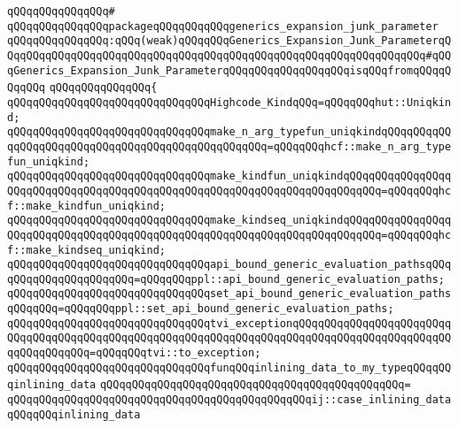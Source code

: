 \verb|qQQqqQQqqQQqqQQq#|\newline
\verb|qQQqqQQqqQQqqQQqpackageqQQqqQQqqQQqgenerics_expansion_junk_parameter|\newline
\verb|qQQqqQQqqQQqqQQq:qQQq(weak)qQQqqQQqGenerics_Expansion_Junk_ParameterqQQqqQQqqQQqqQQqqQQqqQQqqQQqqQQqqQQqqQQqqQQqqQQqqQQqqQQqqQQqqQQqqQQq#qQQqGenerics_Expansion_Junk_ParameterqQQqqQQqqQQqqQQqqQQqisqQQqfromqQQqqQQqqQQq|\newline
\verb|qQQqqQQqqQQqqQQq{|\newline
\verb|qQQqqQQqqQQqqQQqqQQqqQQqqQQqqQQqHighcode_KindqQQq=qQQqqQQqhut::Uniqkind;|\newline
\newline
\verb|qQQqqQQqqQQqqQQqqQQqqQQqqQQqqQQqmake_n_arg_typefun_uniqkindqQQqqQQqqQQqqQQqqQQqqQQqqQQqqQQqqQQqqQQqqQQqqQQqqQQq=qQQqqQQqhcf::make_n_arg_typefun_uniqkind;|\newline
\verb|qQQqqQQqqQQqqQQqqQQqqQQqqQQqqQQqmake_kindfun_uniqkindqQQqqQQqqQQqqQQqqQQqqQQqqQQqqQQqqQQqqQQqqQQqqQQqqQQqqQQqqQQqqQQqqQQqqQQqqQQq=qQQqqQQqhcf::make_kindfun_uniqkind;|\newline
\verb|qQQqqQQqqQQqqQQqqQQqqQQqqQQqqQQqmake_kindseq_uniqkindqQQqqQQqqQQqqQQqqQQqqQQqqQQqqQQqqQQqqQQqqQQqqQQqqQQqqQQqqQQqqQQqqQQqqQQqqQQq=qQQqqQQqhcf::make_kindseq_uniqkind;|\newline
\newline
\verb|qQQqqQQqqQQqqQQqqQQqqQQqqQQqqQQqapi_bound_generic_evaluation_pathsqQQqqQQqqQQqqQQqqQQqqQQq=qQQqqQQqppl::api_bound_generic_evaluation_paths;|\newline
\verb|qQQqqQQqqQQqqQQqqQQqqQQqqQQqqQQqset_api_bound_generic_evaluation_pathsqQQqqQQq=qQQqqQQqppl::set_api_bound_generic_evaluation_paths;|\newline
\newline
\verb|qQQqqQQqqQQqqQQqqQQqqQQqqQQqqQQqtvi_exceptionqQQqqQQqqQQqqQQqqQQqqQQqqQQqqQQqqQQqqQQqqQQqqQQqqQQqqQQqqQQqqQQqqQQqqQQqqQQqqQQqqQQqqQQqqQQqqQQqqQQqqQQqqQQq=qQQqqQQqtvi::to_exception;|\newline
\newline
\verb|qQQqqQQqqQQqqQQqqQQqqQQqqQQqqQQqfunqQQqinlining_data_to_my_typeqQQqqQQqinlining_data|\newline
\verb|qQQqqQQqqQQqqQQqqQQqqQQqqQQqqQQqqQQqqQQqqQQqqQQq=|\newline
\verb|qQQqqQQqqQQqqQQqqQQqqQQqqQQqqQQqqQQqqQQqqQQqqQQqij::case_inlining_dataqQQqqQQqinlining_data|\newline

